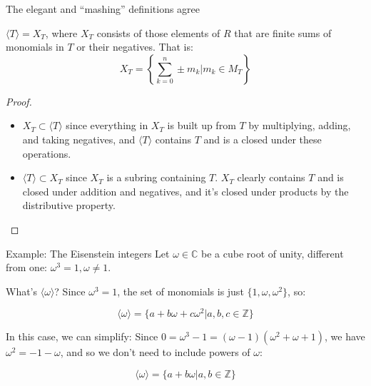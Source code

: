\documentclass{beamer}
\begin{document}
\begin{frame}{The elegant and ``mashing'' definitions agree}

\begin{lemma} $\langle T\rangle=X_T$, where $X_T$ consists of those elements of $R$ that are finite sums of monomials in $T$ or their negatives.  That is: 
$$X_T=\left\{\sum_{k=0}^n \pm m_k \Big| m_k\in M_T\right\}$$

\end{lemma}

\begin{proof} 
\begin{itemize}
\item $X_T\subset \langle T\rangle$ since  everything in $X_T$ is built up from $T$ by multiplying, adding, and taking negatives, and $\langle T\rangle $ contains $T$ and is a closed under these operations.

\item $\langle T\rangle \subset X_T$ since $X_T$ is a subring containing $T$. $X_T$ clearly contains $T$ and is closed under addition and negatives, and it's closed under products by the distributive property.
\end{itemize}
\end{proof}

\end{frame}

\begin{frame}{Example: The Eisenstein integers}
Let $\omega\in\mathbb{C}$ be a cube root of unity, different from one: $\omega^3=1,\omega\neq 1$.  

\begin{block}{What's $\langle\omega\rangle$?}
Since $\omega^3=1$, the set of monomials is just $\{1,\omega, \omega^2\}$, so:

$$\langle \omega\rangle=\{a+b\omega+c\omega^2 | a,b,c\in \mathbb{Z}\}$$
\end{block}


\begin{block}{In this case, we can simplify:}
Since $0=\omega^3-1=(\omega-1)(\omega^2+\omega+1)$, we have $\omega^2=-1-\omega$, and so we don't need to include powers of $\omega$:

$$\langle\omega\rangle=\{a+b\omega | a,b\in\mathbb{Z}\}$$
\end{block}




\end{frame}
\end{document}
